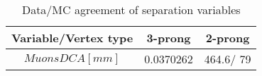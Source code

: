\documentclass{article}
\begin{document}
\begin{table}[htbp]
\caption{\label{tab:sepVars}Data/MC agreement of separation variables}
\begin{center}
\begin{tabular}{c|c|c}
Variable/Vertex type & 3-prong & 2-prong\\
\hline
$Muons DCA [mm]$ & 0.0370262 & 464.6/ 79\\
\hline
\end{tabular}
\end{center}
\end{table}
\end{document}
